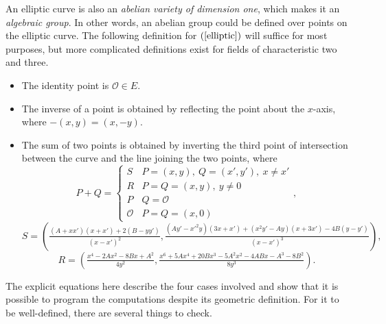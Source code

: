 \documentclass{article}
\newcommand{\rb}[1]{\left( #1 \right)}
\newcommand{\OO}{\mathcal{O}}
\begin{document}
An elliptic curve is also an \emph{abelian variety of dimension one}, which makes it an \emph{algebraic group}. In other words, an abelian group could be defined over points on the elliptic curve. The following definition for $ \rb{\ref{elliptic}} $ will suffice for most purposes, but more complicated definitions exist for fields of characteristic two and three.
\begin{itemize}
\item The identity point is $ \OO \in E $.
\item The inverse of a point is obtained by reflecting the point about the $ x $-axis, where $ -\rb{x, y} = \rb{x, -y} $.
\item The sum of two points is obtained by inverting the third point of intersection between the curve and the line joining the two points, where
$$ P + Q =
\begin{cases}
S & P = \rb{x, y}, \ Q = \rb{x', y'}, \ x \ne x' \\
R & P = Q = \rb{x, y}, \ y \ne 0 \\
P & Q = \OO \\
\OO & P = Q = \rb{x, 0}
\end{cases},
$$
$$ S = \rb{\tfrac{\rb{A + xx'}\rb{x + x'} + 2\rb{B - yy'}}{\rb{x - x'}^2}, \tfrac{\rb{Ay' - x'^2y}\rb{3x + x'} + \rb{x^2y' - Ay}\rb{x + 3x'} - 4B\rb{y - y'}}{\rb{x - x'}^3}}, $$
$$ R = \rb{\tfrac{x^4 - 2Ax^2 - 8Bx + A^2}{4y^2}, \tfrac{x^6 + 5Ax^4 + 20Bx^3 - 5A^2x^2 - 4ABx - A^3 - 8B^2}{8y^3}}. $$
\end{itemize}
The explicit equations here describe the four cases involved and show that it is possible to program the computations despite its geometric definition. For it to be well-defined, there are several things to check.
\end{document}
